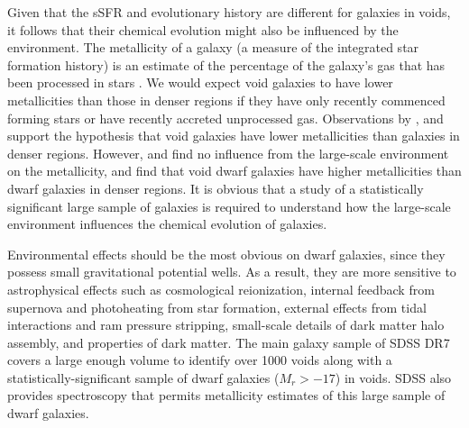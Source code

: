 Given that the sSFR and evolutionary history are different for galaxies in 
voids, it follows that their chemical evolution might also be influenced by the 
environment.  The metallicity of a galaxy (a measure of the integrated star 
formation history) is an estimate of the percentage of the galaxy's gas that has 
been processed in stars \citep{Guseva09}.  We would expect void galaxies to have 
lower metallicities than those in denser regions if they have only recently 
commenced forming stars or have recently accreted unprocessed gas.  Observations 
by \cite{Cooper08,Deng11,Filho15,Pustilnik06,Pustilnik11a,Pustilnik11b,
Pustilnik13,Pustilnik14}, and \cite{Pilyugin17} support the hypothesis that void 
galaxies have lower metallicities than galaxies in denser regions.  However, 
\cite{Kreckel15} and \cite{Douglass17a} find no influence from the large-scale 
environment on the metallicity, and \cite{Douglass17b} find that void dwarf 
galaxies have higher metallicities than dwarf galaxies in denser regions.  It is 
obvious that a study of a statistically significant large sample of galaxies is 
required to understand how the large-scale environment influences the chemical 
evolution of galaxies.

Environmental effects should be the most obvious on dwarf galaxies, since they 
possess small gravitational potential wells.  As a result, they are more 
sensitive to astrophysical effects such as cosmological reionization, internal 
feedback from supernova and photoheating from star formation, external effects 
from tidal interactions and ram pressure stripping, small-scale details of dark 
matter halo assembly, and properties of dark matter.  The main galaxy sample of 
SDSS DR7 covers a large enough volume to identify over 1000 voids \citep{Pan12} 
along with a statistically-significant sample of dwarf galaxies ($M_r > -17$) in 
voids.  SDSS also provides spectroscopy that permits metallicity estimates of 
this large sample of dwarf galaxies.

